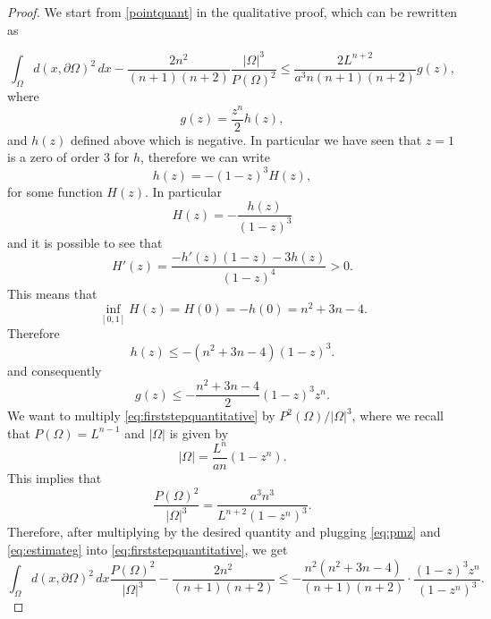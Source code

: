\documentclass[10pt,a4paper]{amsart}
\newcommand{\abs}[1]{{\left|#1\right|}}
\begin{document}
\begin{proof}
   We start from \eqref{pointquant} in the qualitative proof, which can be rewritten as
   
\begin{equation}\label{eq:firststepquantitative}
\int_{\Omega} d(x,\partial\Omega)^2\, dx-\frac{2n^2}{(n+1)(n+2)}\frac{\abs{\Omega}^3}{P(\Omega)^2}\le
    \frac{2L^{n+2}}{a^3n(n+1)(n+2)}g(z),
\end{equation}
where
\begin{equation*}
    g(z) = \frac{z^n}{2}h(z),
\end{equation*}
and $h(z)$ defined above which is negative. In particular we have seen that $z=1$ is a zero of order $3$ for $h$, therefore we can write
\begin{equation*}
    h(z) = -(1-z)^3H(z),
\end{equation*}
for some function $H(z)$. In particular 
\begin{equation*}
    H(z) = -\frac{h(z)}{(1-z)^3}
\end{equation*}
and it is possible to see that
\begin{equation*}
    H'(z) = \frac{-h'(z)(1-z)-3h(z)}{(1-z)^4}>0.
\end{equation*}
This means that 
\begin{equation*}
    \inf_{[0,1]}H(z) = H(0) = -h(0)= n^2+3n-4.
\end{equation*}
Therefore
\begin{equation*}
    h(z) \le -(n^2+3n-4)(1-z)^3.
\end{equation*}
and consequently
\begin{equation}\label{eq:estimateg}
    g(z) \le -\frac{n^2+3n-4}{2}(1-z)^3z^n.
\end{equation}
We want to multiply \eqref{eq:firststepquantitative} by $P^2(\Omega)/\abs{\Omega}^3$, where we recall that $P(\Omega) =L^{n-1}$ and $\abs{\Omega}$ is given by 
\begin{equation}\label{eq:measureomegawithz}
    \abs{\Omega}= \frac{L^n}{an}(1-z^n).
\end{equation}
This implies that
\begin{equation}\label{eq:pmz}
    \frac{P(\Omega)^2}{\abs{\Omega}^3}=\frac{a^3n^3}{L^{n+2}(1-z^n)^3}.
\end{equation}
Therefore, after multiplying by the desired quantity and plugging \eqref{eq:pmz} and \eqref{eq:estimateg} into \eqref{eq:firststepquantitative}, we get
\begin{equation*}
    \int_{\Omega} d(x,\partial\Omega)^2\, dx\frac{P(\Omega)^2}{\abs{\Omega}^3}-\frac{2n^2}{(n+1)(n+2)}\le -\frac{n^2(n^2+3n-4)}{(n+1)(n+2)}\cdot\frac{(1-z)^3z^n}{(1-z^n)^3}.

\end{equation*}
\end{proof}
\end{document}
